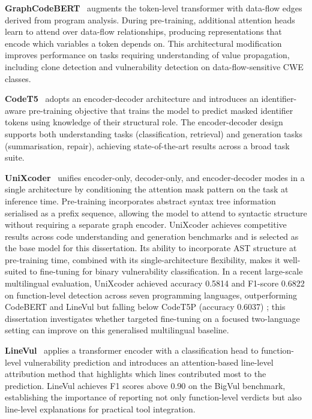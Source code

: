\textbf{GraphCodeBERT}~\cite{guo2021graphcodebert} augments the token-level transformer
with data-flow edges derived from program analysis.
During pre-training, additional attention heads learn to attend over data-flow
relationships, producing representations that encode which variables a token depends on.
This architectural modification improves performance on tasks requiring understanding of
value propagation, including clone detection and vulnerability detection on
data-flow-sensitive CWE classes.

\textbf{CodeT5}~\cite{wang2021codet5} adopts an encoder-decoder architecture and
introduces an identifier-aware pre-training objective that trains the model to predict
masked identifier tokens using knowledge of their structural role.
The encoder-decoder design supports both understanding tasks (classification, retrieval)
and generation tasks (summarisation, repair), achieving state-of-the-art results across a
broad task suite.

\textbf{UniXcoder}~\cite{guo2022unixcoder} unifies encoder-only, decoder-only, and
encoder-decoder modes in a single architecture by conditioning the attention mask pattern
on the task at inference time.
Pre-training incorporates abstract syntax tree information serialised as a prefix sequence,
allowing the model to attend to syntactic structure without requiring a separate graph
encoder.
UniXcoder achieves competitive results across code understanding and generation benchmarks
and is selected as the base model for this dissertation.
Its ability to incorporate AST structure at pre-training time, combined with its
single-architecture flexibility, makes it well-suited to fine-tuning for binary
vulnerability classification.
In a recent large-scale multilingual evaluation, UniXcoder achieved accuracy 0.5814 and
F1-score 0.6822 on function-level detection across seven programming languages,
outperforming CodeBERT and LineVul but falling below CodeT5P (accuracy 0.6037)
\cite{shu2026multilingual}; this dissertation investigates whether targeted fine-tuning
on a focused two-language setting can improve on this generalised multilingual baseline.

\textbf{LineVul}~\cite{fu2022linevul} applies a transformer encoder with a
classification head to function-level vulnerability prediction and introduces an
attention-based line-level attribution method that highlights which lines contributed most
to the prediction.
LineVul achieves F1 scores above 0.90 on the BigVul benchmark, establishing the
importance of reporting not only function-level verdicts but also line-level explanations
for practical tool integration.


